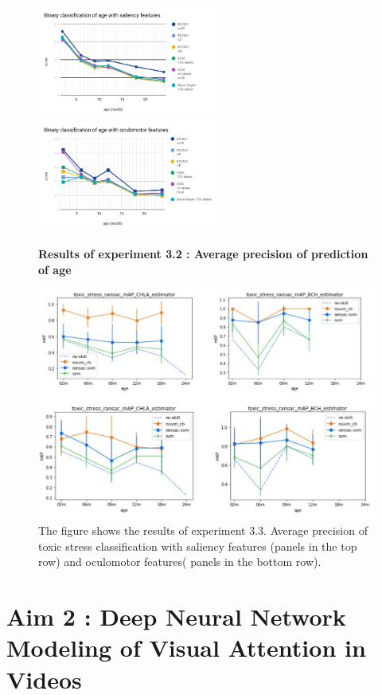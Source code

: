\documentclass[a4paper, times, 12pt, ,onecolumn,oneside,top=1.0cm,bottom=1.0cm,left=1.0 cm,right=1cm]{article}
\begin{document}
\begin{figure}[H]
   \includegraphics[width=0.53\textwidth]{imgs/exp3-2-1.png}
   \hfill
   \includegraphics[width=0.53\textwidth]{imgs/exp3-2-2.png}
   \caption{ \textbf{Results of experiment 3.2 : Average precision of prediction of age} }
\end{figure}


\begin{figure}[H]
  \centering
  \includegraphics[scale = 0.4]{imgs/exp3-3.png}
  \caption{ The figure shows the results of experiment 3.3. Average precision of toxic stress classification with saliency features (panels in the top row) and oculomotor features( panels in the bottom row).}
    \label{fig:baseline}
\end{figure}

\clearpage
\section{Aim 2 : Deep Neural Network Modeling of Visual Attention in Videos }
\end{document}
